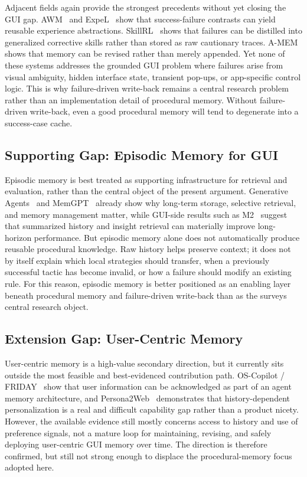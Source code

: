 \documentclass{article}
\begin{document}
Adjacent fields again provide the strongest precedents without yet
closing the GUI gap. AWM~\parencite{wang2024awm} and
ExpeL~\parencite{zhao2024expel} show that success-failure contrasts can
yield reusable experience abstractions. SkillRL~\parencite{xia2026skillrl}
shows that failures can be distilled into generalized corrective skills
rather than stored as raw cautionary traces.
A-MEM~\parencite{xu2025amem} shows that memory can be revised rather
than merely appended. Yet none of these systems addresses the grounded
GUI problem where failures arise from visual ambiguity, hidden
interface state, transient pop-ups, or app-specific control logic. This
is why failure-driven write-back remains a central research problem
rather than an implementation detail of procedural memory. Without
failure-driven write-back, even a good procedural memory will tend to
degenerate into a success-case cache.

\subsection{Supporting Gap: Episodic Memory for
GUI}\label{63-supporting-gap-episodic-memory-for-gui}

Episodic memory is best treated as supporting infrastructure for
retrieval and evaluation, rather than the central object of the present
argument. Generative Agents~\parencite{park2023generativeagents} and
MemGPT~\parencite{packer2023memgpt} already show why long-term storage,
selective retrieval, and memory management matter, while GUI-side
results such as
M2~\parencite{yan2026m2} suggest that summarized history and insight
retrieval can materially improve long-horizon performance. But episodic
memory alone does not automatically produce reusable procedural
knowledge. Raw history helps preserve context; it does not by itself
explain which local strategies should transfer, when a previously
successful tactic has become invalid, or how a failure should modify an
existing rule. For this reason, episodic memory is better positioned as
an enabling layer beneath procedural memory and failure-driven
write-back than as the survey\textquotesingle s central research
object.

\subsection{Extension Gap: User-Centric
Memory}\label{64-extension-gap-user-centric-memory}

User-centric memory is a high-value secondary direction, but it
currently sits outside the most feasible and best-evidenced contribution
path. OS-Copilot / FRIDAY~\parencite{wu2024oscopilot} show that user
information can be acknowledged as part of an agent memory architecture,
and
Persona2Web~\parencite{kim2026persona2web} demonstrates that
history-dependent personalization is a real and difficult capability gap
rather than a product nicety. However, the available evidence still
mostly concerns access to history and use of preference signals, not a
mature loop for maintaining, revising, and safely deploying
user-centric GUI memory over time. The direction is therefore
confirmed, but still not strong enough to displace the
procedural-memory focus adopted here.
\end{document}
